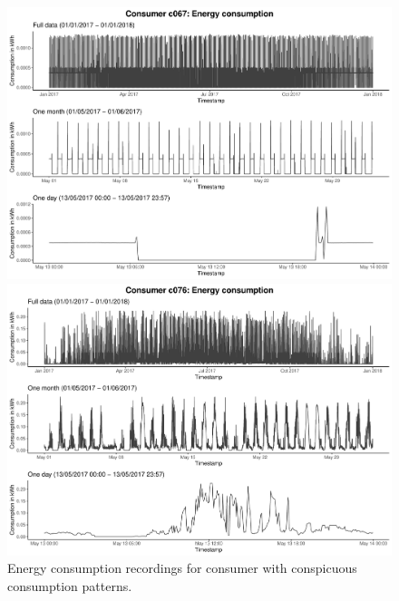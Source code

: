 \begin{figure}
    \begin{minipage}[ht]{\dimexpr.5\textheight-0.15em}
    \includegraphics[width=\textwidth]{thesis/graphs/timeseries/c067_cons.pdf}
    \end{minipage}
    \begin{minipage}[ht]{\dimexpr.5\textheight-0.15em}
    \includegraphics[width=\textwidth]{thesis/graphs/timeseries/c076_cons.pdf}
    \end{minipage}
    
    \caption[Energy consumption recordings for consumer with conspicuous consumption patterns]{Energy consumption recordings for consumer with conspicuous consumption patterns.}
    \label{fig:consenergycons_peculiar}
\end{figure}

